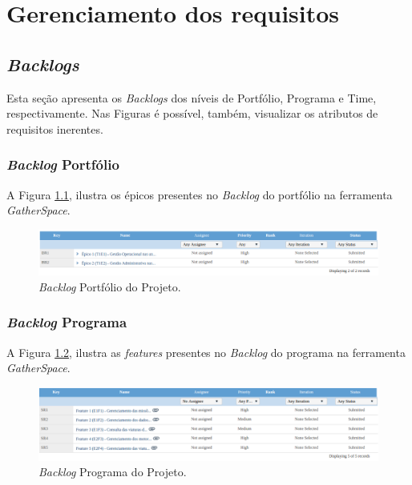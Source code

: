 \chapter{Gerenciamento dos requisitos}

  \section{\textit{Backlogs}}
  
  Esta seção apresenta os \textit{Backlogs} dos níveis de Portfólio, Programa e Time, respectivamente. Nas Figuras é possível, também, visualizar os
  atributos de requisitos inerentes.
  
    \subsection{\textit{Backlog} Portfólio}
    
     A Figura \ref{fig:backlog_portifolio}, ilustra os épicos presentes no \textit{Backlog} do portfólio na ferramenta \textit{GatherSpace}.
      
       \begin{figure}[!htbp]
	\centering
	\includegraphics[scale=0.5, angle = 0]{figuras/backlog_portfolio}
	\caption[\textit{Backlog} Portfólio do Projeto]
	    {\textit{Backlog} Portfólio do Projeto.}
	\label{fig:backlog_portifolio}
      \end{figure}
    
    \subsection{\textit{Backlog} Programa}
    
   A Figura \ref{fig:backlog_programa}, ilustra as \textit{features} presentes no \textit{Backlog} do programa na ferramenta \textit{GatherSpace}.
    
       \begin{figure}[!htbp]
	\centering
	\includegraphics[scale=0.5, angle = 0]{figuras/backlog_programa}
	\caption[\textit{Backlog} Programa do Projeto]
	    {\textit{Backlog} Programa do Projeto.}
	\label{fig:backlog_programa}
      \end{figure}
    
